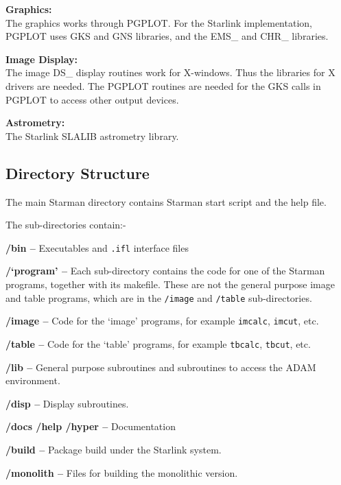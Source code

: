 \begin{list}{{-}}{}

\item {\bf Graphics: \\ }
     The graphics works through PGPLOT. For the Starlink
     implementation, PGPLOT uses GKS and GNS libraries, and the EMS\_
     and CHR\_ libraries.

\item {\bf Image Display: \\ }
     The image DS\_ display routines work for X-windows. Thus the
     libraries for X drivers are needed. The PGPLOT routines are needed
     for the GKS calls in PGPLOT to access other output devices.

\item {\bf Astrometry: \\ }
      The Starlink SLALIB astrometry library.

\end{list}

\subsection{Directory Structure}


The main Starman directory contains Starman start script and the help
file.


The sub-directories contain:-


\begin{list}{{-}}{}

\item {\bf /bin -- } Executables and \verb|.ifl| interface files

\item {\bf /`program' -- } Each sub-directory contains the code for one
      of the Starman programs, together with its makefile. These are
      not the general purpose image and table programs, which are in
      the \verb|/image| and \verb|/table|  sub-directories.

\item {\bf /image -- } Code for the `image' programs, for example
		       \verb|imcalc|, \verb|imcut|, etc.

\item {\bf /table -- } Code for the `table' programs, for example
		       \verb|tbcalc|, \verb|tbcut|, etc.

\item {\bf /lib -- } General purpose subroutines and subroutines to
		     access the ADAM environment.

\item {\bf /disp -- } Display subroutines.

\item {\bf /docs /help /hyper -- } Documentation

\item {\bf /build -- } Package build under the Starlink system.

\item {\bf /monolith -- } Files for building the monolithic version.

\end{list}


